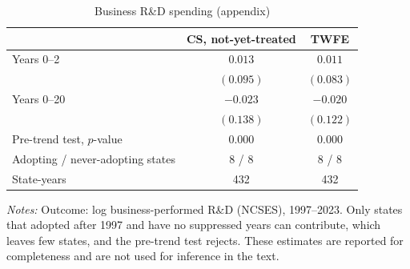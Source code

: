 \begin{table}[t]
\centering
\caption{Business R\&D spending (appendix)}
\label{tab:rd}
\begin{threeparttable}
\begin{tabular}{lcc}
\toprule
 & CS, not-yet-treated & TWFE \\
\midrule
Years 0--2 & $0.013$ & $0.011$ \\
 & $(0.095)$ & $(0.083)$ \\[2pt]
Years 0--20 & $-0.023$ & $-0.020$ \\
 & $(0.138)$ & $(0.122)$ \\[2pt]
Pre-trend test, $p$-value & 0.000 & 0.000 \\
\midrule
Adopting / never-adopting states & 8 / 8 & 8 / 8 \\
State-years & 432 & 432 \\
\bottomrule
\end{tabular}
\begin{tablenotes}[flushleft]\footnotesize
\item \textit{Notes:} Outcome: log business-performed R\&D (NCSES), 1997--2023. Only states that adopted
after 1997 and have no suppressed years can contribute, which leaves few states, and the pre-trend test
rejects. These estimates are reported for completeness and are not used for inference in the text.
\end{tablenotes}
\end{threeparttable}
\end{table}
